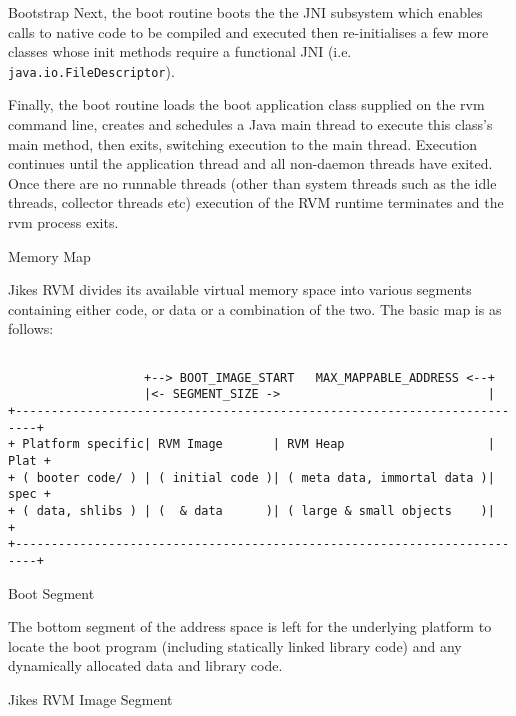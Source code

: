 \begin{section}{Bootstrap}
Next, the boot routine boots the the JNI subsystem which enables calls to native code to be compiled and executed then re-initialises a few more classes whose init methods require a functional JNI (i.e. \texttt{ja\-va.io.Fi\-le\-Des\-crip\-tor}).

Finally, the boot routine loads the boot application class supplied on the rvm command line, creates and schedules a Java main thread to execute this class's main method, then exits, switching execution to the main thread. Execution continues until the application thread and all non-daemon threads have exited. Once there are no runnable threads (other than system threads such as the idle threads, collector threads etc) execution of the RVM runtime terminates and the rvm process exits.

\begin{subsection}{Memory Map}

Jikes RVM divides its available virtual memory space into various segments containing either code, or data or a combination of the two. The basic map is as follows:
\begin{lstlisting}[basicstyle=\scriptsize\ttfamily,frame=none] 

                   +--> BOOT_IMAGE_START   MAX_MAPPABLE_ADDRESS <--+
                   |<- SEGMENT_SIZE ->                             |
+-------------------------------------------------------------------------+
+ Platform specific| RVM Image       | RVM Heap                    | Plat +
+ ( booter code/ ) | ( initial code )| ( meta data, immortal data )| spec +
+ ( data, shlibs ) | (  & data      )| ( large & small objects    )|      +
+-------------------------------------------------------------------------+
\end{lstlisting}

\begin{subsubsection}{Boot Segment}

The bottom segment of the address space is left for the underlying platform to locate the boot program (including statically linked library code) and any dynamically allocated data and library code.

\end{subsubsection}

\begin{subsubsection}{Jikes RVM Image Segment}


\end{subsubsection}
\end{subsection}
\end{section}

